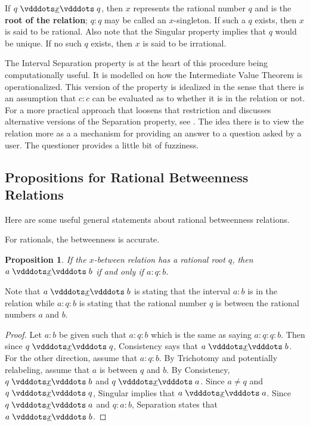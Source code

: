 \documentclass[12pt]{article}
\newtheorem{proposition}{Proposition}[section]
\begin{document}
If $q \xrel q$, then $x$ represents the rational number $q$ and is the \textbf{root of the relation}; $q:q$ may be called an $x$-singleton. If such a $q$ exists, then $x$ is said to be rational. Also note that the Singular property implies that $q$ would be unique. If no such $q$ exists, then $x$ is said to be irrational. 

The Interval Separation property is at the heart of this procedure being computationally useful. It is modelled on how the Intermediate Value Theorem is operationalized. This version of the property is idealized in the sense that there is an assumption that $c:c$ can be evaluated as to whether it is in the relation or not. For a more practical approach that loosens that restriction and discusses alternative versions of the Separation property, see \cite{taylor23main}. The idea there is to view the relation more as a a mechanism for providing an answer to a question asked by a user. The questioner provides a little bit of fuzziness. 


\subsection{Propositions for Rational Betweenness Relations}

Here are some useful general statements about rational betweenness relations. 

For rationals, the betweenness is accurate. 

\begin{proposition}\label{br:rooted}
    If the $x$-between relation has a rational root $q$, then $a \xrel b$ if and only if $a : q : b$.
\end{proposition}

Note that $a \xrel b$ is stating that the interval $a:b$ is in the relation while $a:q:b$ is stating that the rational number $q$ is between the rational numbers $a$ and $b$.

\begin{proof}
    Let $a : b$ be given such that $a : q : b$ which is the same as saying $a:q:q:b$. Then since $q \xrel q$, Consistency says that $a \xrel b$. For the other direction, assume that \sout{$a:q:b$}. By Trichotomy and potentially relabeling, assume that $a$ is between $q$ and $b$. By Consistency, $q \xrel b$ and $q\xrel a$.  Since $a \neq q$ and $q \xrel q$, Singular implies that \sout{$a \xrel a$}. Since $q \xrel a$ and $q:a:b$, Separation states that \sout{$ a \xrel b$}. 
\end{proof}
\end{document}
